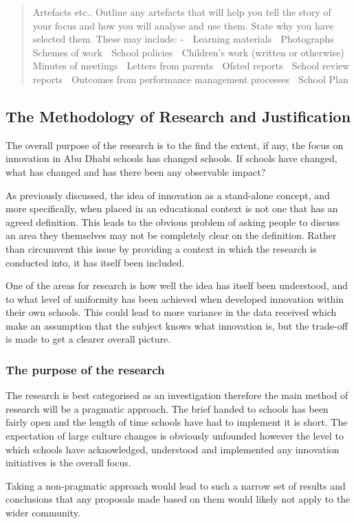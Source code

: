 \begin{quote}
Artefacts etc..
Outline any artefacts that will help you tell the story of your focus and how you will analyse and use them. State why you have selected them. These may include: -
	Learning materials
	Photographs
	Schemes of work
	School policies
	Children's work (written or otherwise)
	Minutes of meetings
	Letters from parents
	Ofsted reports
	School review reports
	Outcomes from performance management processes
	School Plan
\end{quote}

\subsection{The Methodology of Research and Justification}
The overall purpose of the research is to the find the extent, if any, the focus on innovation in Abu Dhabi schools has changed schools. If schools have changed, what has changed and has there been any observable impact?

As previously discussed, the idea of innovation as a stand-alone concept, and more specifically, when placed in an educational context is not one that has an agreed definition. This leads to the obvious problem of asking people to discuss an area they themselves may not be completely clear on the definition. Rather than circumvent this issue by providing a context in which the research is conducted into, it has itself been included.

One of the areas for research is how well the idea has itself been understood, and to what level of uniformity has been achieved when developed innovation within their own schools. This could lead to more variance in the data received which make an assumption that the subject knows what innovation is, but the trade-off is made to get a clearer overall picture.

\subsubsection{The purpose of the research}
The research is best categorised as an investigation therefore the main method of research will be a pragmatic approach. The brief handed to schools has been fairly open and the length of time schools have had to implement it is short. The expectation of large culture changes is obviously unfounded however the level to which schools have acknowledged, understood and implemented any innovation initiatives is the overall focus. 

Taking a non-pragmatic approach would lead to such a narrow set of results and conclusions that any proposals made based on them would likely not apply to the wider community. 

